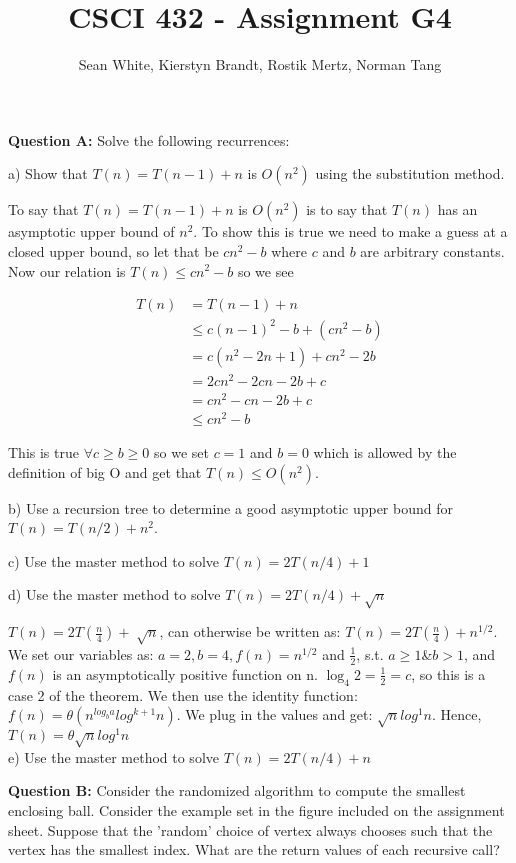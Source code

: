 \documentclass[12pt]{article}
\author{Sean White, Kierstyn Brandt, Rostik Mertz, Norman Tang}
\title{CSCI 432 - Assignment G4}
\begin{document}
\maketitle

\noindent
\textbf{Question A:} Solve the following recurrences: \smallskip

a) Show that $T(n) = T(n - 1) + n$ is $O(n^2)$ using the substitution method.\smallskip

To say that $T(n) = T(n - 1) + n$ is $O(n^2)$ is to say that $T(n)$ has an asymptotic upper bound of $n^2$. To show this is true we need to make a guess at a closed upper bound, so let that be $cn^2 - b$ where $c$ and $b$ are arbitrary constants. Now our relation is $T(n) \leq cn^2 -b$ so we see

\begin{align*}
T(n) &= T(n - 1) + n\\
&\leq c(n-1)^2 - b + (cn^2 - b)\\
&= c(n^2 - 2n + 1) + cn^2 -2b\\
&= 2cn^2 - 2cn - 2b + c\\
&= cn^2 - cn - 2b + c\\
&\leq cn^2 - b
\end{align*}

This is true $\forall c \geq b \geq 0$ so we set $c = 1$ and $b = 0$ which is allowed by the definition of big O and get that $T(n) \leq O(n^2)$.
\bigskip

b) Use a recursion tree to determine a good asymptotic upper bound for $T(n) = T(n/2) + n^2$. \smallskip

c) Use the master method to solve $T(n) = 2T(n/4) + 1$ \smallskip

d) Use the master method to solve $T(n) = 2T(n/4) + \sqrt{n}$ \smallskip

$T(n) = 2T(\frac{n}{4})+\sqrt[]{n}$, can otherwise be written as: $T(n) = 2T(\frac{n}{4})+n^{1/2}$. \\
We set our variables as: $a=2, b=4, f(n)=n^{1/2}$ and $\frac{1}{2}$, s.t. $a\geq1$\&$b>1$, and $f(n)$ is an asymptotically positive function on n. $\log_4 2 = \frac{1}{2} = c$, so this is a case 2 of the theorem. We then use the identity function: $f(n) = \theta(n^{log_ba}log^{k+1} n)$.
We plug in the values and get: $\sqrt{n}log^1n$. Hence, $T(n)= \theta\sqrt{n}log^1n$ \\

e) Use the master method to solve $T(n) = 2T(n/4) + n$ \smallskip

\noindent
\textbf{Question B:} Consider the randomized algorithm to compute the smallest enclosing ball. Consider the example set in the figure included on the assignment sheet. Suppose that the 'random' choice of vertex always chooses such that the vertex has the smallest index. What are the return values of each recursive call? \smallskip
\end{document}
